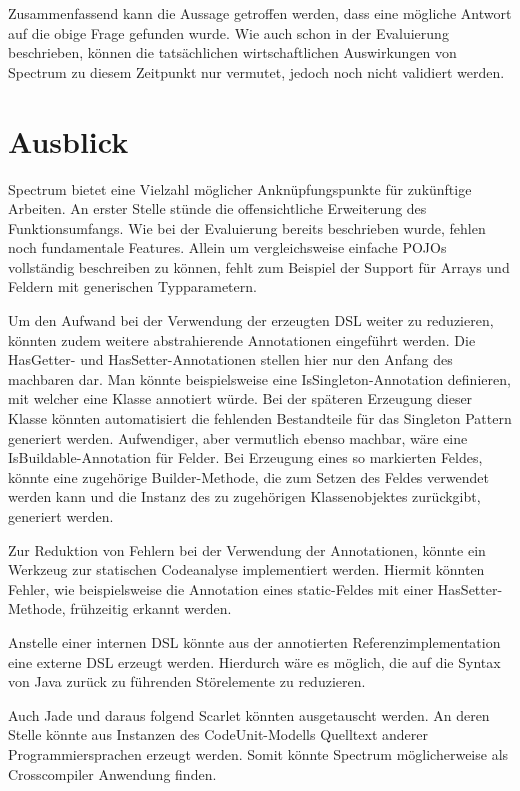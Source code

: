 \documentclass[12pt,oneside,a4paper,parskip]{scrbook}
\begin{document}
Zusammenfassend kann die Aussage getroffen werden, dass eine mögliche Antwort auf die obige Frage gefunden wurde. Wie auch schon in der Evaluierung beschrieben, können die tatsächlichen wirtschaftlichen Auswirkungen von Spectrum zu diesem Zeitpunkt nur vermutet, jedoch noch nicht validiert werden.

\section{Ausblick}

Spectrum bietet eine Vielzahl möglicher Anknüpfungspunkte für zukünftige Arbeiten. An erster Stelle stünde die offensichtliche Erweiterung des Funktionsumfangs. Wie bei der Evaluierung bereits beschrieben wurde, fehlen noch fundamentale Features. Allein um vergleichsweise einfache POJOs vollständig beschreiben zu können, fehlt zum Beispiel der Support für Arrays und Feldern mit generischen Typparametern.

Um den Aufwand bei der Verwendung der erzeugten DSL weiter zu reduzieren, könnten zudem weitere abstrahierende Annotationen eingeführt werden. Die HasGetter- und HasSetter-Annotationen stellen hier nur den Anfang des machbaren dar. Man könnte beispielsweise eine IsSingleton-Annotation definieren, mit welcher eine Klasse annotiert würde. Bei der späteren Erzeugung dieser Klasse könnten automatisiert die fehlenden Bestandteile für das Singleton Pattern generiert werden. Aufwendiger, aber vermutlich ebenso machbar, wäre eine IsBuildable-Annotation für Felder. Bei Erzeugung eines so markierten Feldes, könnte eine zugehörige Builder-Methode, die zum Setzen des Feldes verwendet werden kann und die Instanz des zu zugehörigen Klassenobjektes zurückgibt, generiert werden.

Zur Reduktion von Fehlern bei der Verwendung der Annotationen, könnte ein Werkzeug zur statischen Codeanalyse implementiert werden. Hiermit könnten Fehler, wie beispielsweise die Annotation eines static-Feldes mit einer HasSetter-Methode, frühzeitig erkannt werden.

Anstelle einer internen DSL könnte aus der annotierten Referenzimplementation eine externe DSL erzeugt werden. Hierdurch wäre es möglich, die auf die Syntax von Java zurück zu führenden Störelemente zu reduzieren.

Auch Jade und daraus folgend Scarlet könnten ausgetauscht werden. An deren Stelle könnte aus Instanzen des CodeUnit-Modells Quelltext anderer Programmiersprachen erzeugt werden. Somit könnte Spectrum möglicherweise als Crosscompiler Anwendung finden.
\end{document}
